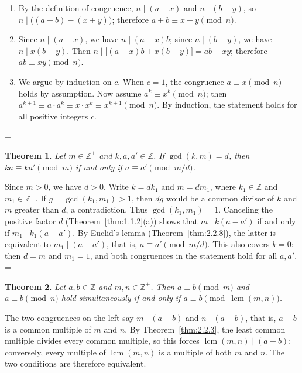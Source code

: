 \documentclass[11pt]{article}
\makeatletter
\theoremstyle{ntstyle}
\newtheorem{theorem}{Theorem}[subsection]
\let\nt@closedisplay\]
\def\nt@guardedclose{\@ifnextchar\par{\nt@closeafterpar}{\@ifnextchar\end{\postdisplaypenalty\@M\nt@closedisplay}{\nt@closedisplay}}}
\def\nt@closeafterpar\par{\@ifnextchar\par{\nt@closeafterpar}{\@ifnextchar\end{\postdisplaypenalty\@M\nt@closedisplay\par}{\nt@closedisplay\par}}}
\renewenvironment{proof}[1][\proofname]{\par
  \pushQED{\qed}\normalfont\topsep\medskipamount\edef\nt@afterproof{\@endparpenalty=\the\@endparpenalty\relax}\@beginparpenalty\@M\@endparpenalty\@M\let\]\nt@guardedclose\trivlist\item[]\textit{#1\@addpunct{.}} \ignorespaces}{\ifvmode\addpenalty\@M\fi\popQED\nt@afterproof\endtrivlist\@endpefalse}
\DeclareMathOperator{\lcm}{lcm}
\makeatother
\begin{document}
\begin{proof}

	\begin{enumerate}[label={\alph*)}]
		\item By the definition of congruence, $n \mid (a - x)$ and $n \mid (b
						- y)$, so $n \mid \big((a \pm b) - (x \pm y)\big)$; therefore $a \pm
						b \equiv x \pm y \pmod{n}$.
		\item Since $n \mid (a-x)$, we have $n \mid (a-x)b$; since $n \mid (b - y)$, we have $n
						\mid x(b-y)$. Then $n \mid \big[(a-x)b + x(b-y)\big] = ab - xy$;
					therefore $ab \equiv xy \pmod{n}$.
		\item We argue by induction on $c$. When $c = 1$, the congruence $a
						\equiv x \pmod{n}$ holds by assumption. Now assume $a^{k}
						\equiv x^{k} \pmod{n}$; then $a^{k+1} \equiv a \cdot a^{k} \equiv x
						\cdot x^{k} \equiv x^{k+1} \pmod{n}$. By induction, the statement
					holds for all positive integers $c$.\qedhere
	\end{enumerate}
\end{proof}
\begin{theorem}\label{thm:3.1.2} Let $m \in \mathbb{Z}^+$ and $k,
		a, a' \in \mathbb{Z}$. If $\gcd(k, m) = d$, then $ka
		\equiv ka' \pmod{m}$ if and only if $a \equiv a' \pmod{m/d}$.
\end{theorem}

\begin{proof} Since $m>0$, we have $d>0$. Write $k=dk_1$ and
	$m=dm_1$, where $k_1\in\mathbb{Z}$ and $m_1\in\mathbb{Z}^+$.
	If $g=\gcd(k_1,m_1)>1$, then $dg$ would be a common divisor of $k$
	and $m$ greater than $d$, a contradiction. Thus $\gcd(k_1,m_1)=1$.
	Canceling the positive factor $d$ (Theorem~\ref{thm:1.1.2}(a)) shows that
	$m\mid k(a-a')$ if and only if $m_1\mid k_1(a-a')$.
	By Euclid's lemma (Theorem~\ref{thm:2.2.8}), the latter is equivalent to
	$m_1\mid(a-a')$, that is, $a\equiv a'\pmod{m/d}$.
	This also covers $k=0$: then $d=m$ and $m_1=1$, and both congruences
	in the statement hold for all $a,a'$.
\end{proof}
\begin{theorem}\label{thm:3.1.3} Let $a, b \in
		\mathbb{Z}$ and $m, n \in \mathbb{Z}^+$. Then $a \equiv b \pmod{m}$
	and $a \equiv b \pmod{n}$ hold simultaneously if and only if $a \equiv b
		\pmod{\lcm(m, n)}$.
\end{theorem}

\begin{proof} The two congruences on the left say $m \mid (a
		- b)$ and $n \mid (a - b)$, that is, $a - b$ is a common multiple of $m$
	and $n$. By Theorem~\ref{thm:2.2.3}, the least common multiple divides every common
	multiple, so this forces $\lcm(m, n) \mid (a - b)$;
	conversely, every multiple of $\lcm(m, n)$ is a multiple of
	both $m$ and $n$. The two conditions are therefore equivalent.
\end{proof}
\end{document}
